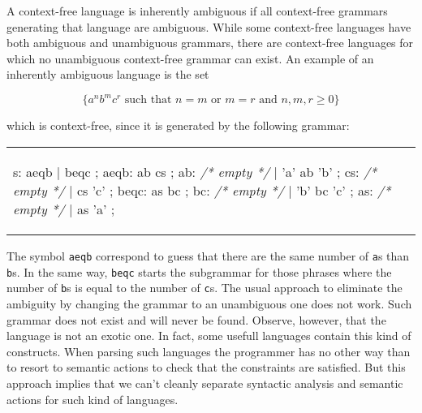 A context-free language is inherently ambiguous if all context-free
grammars generating that language are ambiguous.  While some
context-free languages  have both ambiguous and unambiguous grammars, there
are context-free languages for which no unambiguous context-free
grammar can exist. An example of an inherently ambiguous language
is the set 

\[\{ a^n b^m c^r \mbox{ such that } n = m \mbox{ or } m = r \mbox{ and } n,m,r \ge 0 \} \]

\noindent which is context-free, since it is generated by the following grammar:

\begin{center}
\begin{tabular}{p{6.3cm}}
\begin{VERBATIM}
s: aeqb | beqc ;
aeqb: ab cs ;
ab: \textit{/* empty */} | 'a' ab 'b' ;
cs: \textit{/* empty */} | cs 'c' ;
beqc: as bc ;
bc: \textit{/* empty */} | 'b' bc 'c' ;
as: \textit{/* empty */} | as 'a' ; \label{vrb:as}
\end{VERBATIM}
\end{tabular}
\end{center}

The symbol \verb|aeqb| correspond to guess that there are the same number of \verb|a|s than \verb|b|s.
In the same way, \verb|beqc| starts the subgrammar for those phrases where the number of \verb|b|s is equal
to the number of \verb|c|s. The usual approach to eliminate the ambiguity by changing the grammar to an unambiguous one does not work.
Such grammar does not exist and will never be found. Observe, however, that the language is not an exotic one.
In fact, some usefull languages contain this kind of constructs. When parsing such languages the programmer has 
no other way than to resort to semantic actions to check that the constraints are satisfied. 
But this approach implies that we can't cleanly separate syntactic analysis and semantic actions for such kind of languages. 

